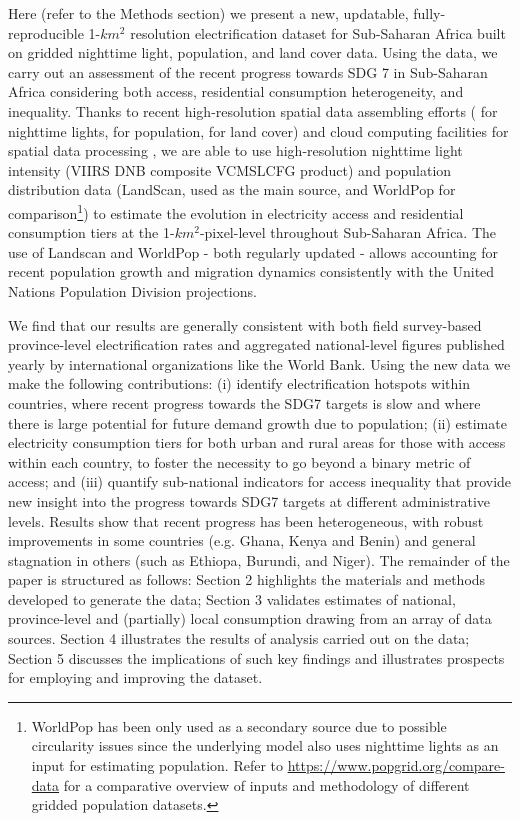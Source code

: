 \documentclass[preprint,12pt]{elsarticle}
\begin{document}
Here (refer to the Methods section) we present a new, updatable, fully-reproducible 1-$km^2$ resolution electrification dataset for Sub-Saharan Africa built on gridded nighttime light, population, and land cover data. Using the data, we carry out an assessment of the recent progress towards SDG 7 in Sub-Saharan Africa considering both access, residential consumption heterogeneity, and inequality. Thanks to recent high-resolution spatial data assembling efforts (\citet{baugh2013nighttime} for nighttime lights, \citet{dobson2000landscan, tatem2017worldpop} for population, \citet{friedl2015mcd12q1} for land cover) and cloud computing facilities for spatial data processing \citep{gorelick2017google}, we are able to use high-resolution nighttime light intensity (VIIRS DNB composite VCMSLCFG product) and population distribution data (LandScan, used as the main source, and WorldPop for comparison\footnote{WorldPop has been only used as a secondary source due to possible circularity issues since the underlying model also uses nighttime lights as an input for estimating population. Refer to \url{https://www.popgrid.org/compare-data} for a comparative overview of inputs and methodology of different gridded population datasets.}) to estimate the evolution in electricity access and residential consumption tiers at the 1-$km^{2}$-pixel-level throughout Sub-Saharan Africa. The use of Landscan and WorldPop - both regularly updated - allows accounting for recent population growth and migration dynamics consistently with the United Nations Population Division projections. 

We find that our results are generally consistent with both field survey-based province-level electrification rates and aggregated national-level figures published yearly by international organizations like the World Bank. Using the new data we make the following contributions: (i) identify electrification hotspots within countries, where recent progress towards the SDG7 targets is slow and where there is large potential for future demand growth due to population; (ii) estimate electricity consumption tiers for both urban and rural areas for those with access within each country, to foster the necessity to go beyond a binary metric of access; and (iii) quantify sub-national indicators for access inequality that provide new insight into the progress towards SDG7 targets at different administrative levels. Results show that recent progress has been heterogeneous, with robust improvements in some countries (e.g. Ghana, Kenya and Benin) and general stagnation in others (such as Ethiopa, Burundi, and Niger). The remainder of the paper is structured as follows: Section 2 highlights the materials and methods developed to generate the data; Section 3 validates estimates of national, province-level and (partially) local consumption drawing from an array of data sources. Section 4 illustrates the results of analysis carried out on the data; Section 5 discusses the implications of such key findings and illustrates prospects for employing and improving the dataset. 
\end{document}
